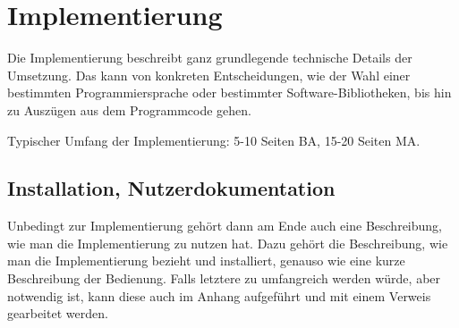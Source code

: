 \chapter{Implementierung}

Die Implementierung beschreibt ganz grundlegende technische Details der Umsetzung. Das kann von konkreten Entscheidungen, wie der Wahl einer bestimmten Programmiersprache oder bestimmter Software-Bibliotheken, bis hin zu Auszügen aus dem Programmcode gehen.

Typischer Umfang der Implementierung: 5-10 Seiten BA, 15-20 Seiten MA.

\section{Installation, Nutzerdokumentation}

Unbedingt zur Implementierung gehört dann am Ende auch eine Beschreibung, wie man die Implementierung zu nutzen hat. Dazu gehört die Beschreibung, wie man die Implementierung bezieht und installiert, genauso wie eine kurze Beschreibung der Bedienung. Falls letztere zu umfangreich werden würde, aber notwendig ist, kann diese auch im Anhang aufgeführt und mit einem Verweis gearbeitet werden.
